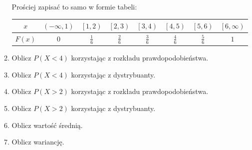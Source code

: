 \documentclass[twoside]{mwart}
\newcommand{\ans}[1]{}
\newcommand{\ans}[1]{\par\emph{Odpowiedź:} #1}
\begin{document}
\begin{enumerate}
\begin{enumerate}
{	Prościej zapisać to samo w formie tabeli:\\
	\begin{tabular}{c|ccccccc}
		$x$ & $\left(-\infty, 1\right)$ & $\left[1, 2\right)$ & $\left[2, 3\right)$ & $\left[3, 4\right)$ & $\left[4, 5\right)$ & $\left[5, 6\right)$ & $\left[6, \infty\right)$ \\
		\hline
		$F(x)$ & $0$ & $\frac{1}{6}$ & $\frac{2}{6}$ & $\frac{3}{6}$ & $\frac{4}{6}$ & $\frac{5}{6}$ & $1$ \\
	\end{tabular}
}
\item Oblicz $P(X<4)$ korzystając z rozkładu prawdopodobieństwa. \ans{\[P(X<4)=P(X=1)+P(X=2)+P(X=3)=\frac{1}{6}+\frac{1}{6}+\frac{1}{6}=\frac{3}{6}\]}
\item Oblicz $P(X<4)$ korzystając z dystrybuanty. 
\ans{\[P(X<4)=\lim_{x\to 4-} F(x) = F(3) = \frac{1}{2}\]
	Przejście od $x\to 4-$ do $3$ wynika z tego, że de facto interesuje nas dowolna liczba z przedziału kończącego się w 4 otwartym, tj. przedziału $\left[3,4\right)$, a zatem np. $3$.
}
\item Oblicz $P(X>2)$ korzystając z rozkładu prawdopodobieństwa. \ans{\[P(X>2)=P(X=3)+P(X=4)+P(X=5)+P(X=6)=\frac{1}{6}+\frac{1}{6}+\frac{1}{6}+\frac{1}{6}=\frac{4}{6}\]}
\item Oblicz $P(X>2)$ korzystając z dystrybuanty. \ans{\[P(X>2)=1-P(X\leq 2)=1-F(2)=1-\frac{2}{6}=\frac{2}{3}\]}
\item Oblicz wartość średnią. \ans{
	\[EX=\sum_{x_i} x_i\cdot P(X=x_i) = 1\cdot\frac{1}{6} +2\cdot\frac{1}{6} +3\cdot\frac{1}{6} +4\cdot\frac{1}{6} +5\cdot\frac{1}{6} +6\cdot\frac{1}{6} +  \frac{21}{6}=3{,}5\]
}
\item Oblicz wariancję.
\ans{
	Dwa sposoby:
	\begin{enumerate}
		\item Bezpośrednio z definicji
		\begin{align*}
		 D^2X = & E\left[(X-EX)^2\right] = \sum_{x_i} \left(x_i-EX)^2\cdot P(X=x_i)\right) = \\ & (1 - 3{,}5)^2\cdot\frac{1}{6} (2 - 3{,}5)^2\cdot\frac{1}{6} (3 - 3{,}5)^2\cdot\frac{1}{6} (4 - 3{,}5)^2\cdot\frac{1}{6} (5 - 3{,}5)^2\cdot\frac{1}{6} (6 - 3{,}5)^2\cdot\frac{1}{6} = \\ &		 
		\frac{1}{6}((-2{,}5)^2+(-1{,}5)^2+(-0{,}5)^2+2{,}5^2+1{,}5^2+0{,}5^2)
		= 2\frac{11}{12}
		\end{align*}
		\item Posługując się przekształconym wzorem:
		\begin{align*}

\end{align*}
\end{enumerate}}
\end{enumerate}
\end{enumerate}
\end{document}
